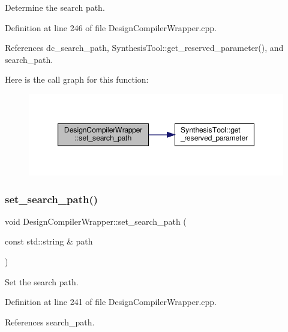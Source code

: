 Determine the search path. 



Definition at line 246 of file Design\+Compiler\+Wrapper.\+cpp.



References dc\+\_\+search\+\_\+path, Synthesis\+Tool\+::get\+\_\+reserved\+\_\+parameter(), and search\+\_\+path.

Here is the call graph for this function\+:
\nopagebreak
\begin{figure}[H]
\begin{center}
\leavevmode
\includegraphics[width=347pt]{d5/d55/classDesignCompilerWrapper_abb0c8853b1684a038e02623521c8ac05_cgraph}
\end{center}
\end{figure}
\mbox{\label{classDesignCompilerWrapper_ad70c35a8c49dd0568b2b3df10d1c05a3}} 
\subsubsection{\texorpdfstring{set\+\_\+search\+\_\+path()}{set\_search\_path()}\hspace{0.1cm}{\footnotesize\ttfamily [2/2]}}
{\footnotesize\ttfamily void Design\+Compiler\+Wrapper\+::set\+\_\+search\+\_\+path (\begin{DoxyParamCaption}\item[{const std\+::string \&}]{path }\end{DoxyParamCaption})}



Set the search path. 



Definition at line 241 of file Design\+Compiler\+Wrapper.\+cpp.



References search\+\_\+path.

